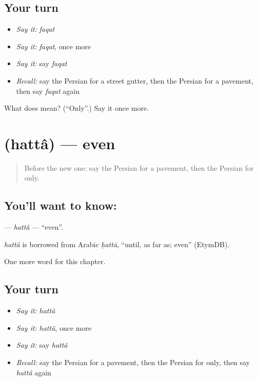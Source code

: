 \subsection*{Your turn}
\begin{itemize}
\raggedright
  \item \emph{Say it:} \emph{faqat}
  \item \emph{Say it:} \emph{faqat}, once more
  \item \emph{Say it:} say \emph{faqat}
  \item \emph{Recall:} say the Persian for a street gutter, then the Persian for a pavement, then say \emph{faqat} again
\end{itemize}

\begin{tcolorbox}[breakable,colback=teal!4,colframe=teal!35!black,title={Before you move on}]
What does  mean? (\textquotedblleft{}Only\textquotedblright{}.) Say it once more.
\end{tcolorbox}
\section[\texorpdfstring{\fa{حتی} (hattâ)}{حتی (hattâ)}]{ (hattâ) — even}

\label{lesson:FA-C269-hatta}



\begin{quote}
Before the new one: say the Persian for a pavement, then the Persian for only.
\end{quote}

\subsection*{You'll want to know: }
\textbf{} — \emph{hattâ} — \textquotedblleft{}even\textquotedblright{}.

\begin{cousinweb}
\emph{hattâ} is borrowed from Arabic \emph{ḥattā}, \textquotedblleft{}until, as far as; even\textquotedblright{} (EtymDB).
\end{cousinweb}

\begin{grammarlens}[title={What you've built}]
One more word for this chapter.
\end{grammarlens}

\subsection*{Your turn}
\begin{itemize}
\raggedright
  \item \emph{Say it:} \emph{hattâ}
  \item \emph{Say it:} \emph{hattâ}, once more
  \item \emph{Say it:} say \emph{hattâ}
  \item \emph{Recall:} say the Persian for a pavement, then the Persian for only, then say \emph{hattâ} again
\end{itemize}

